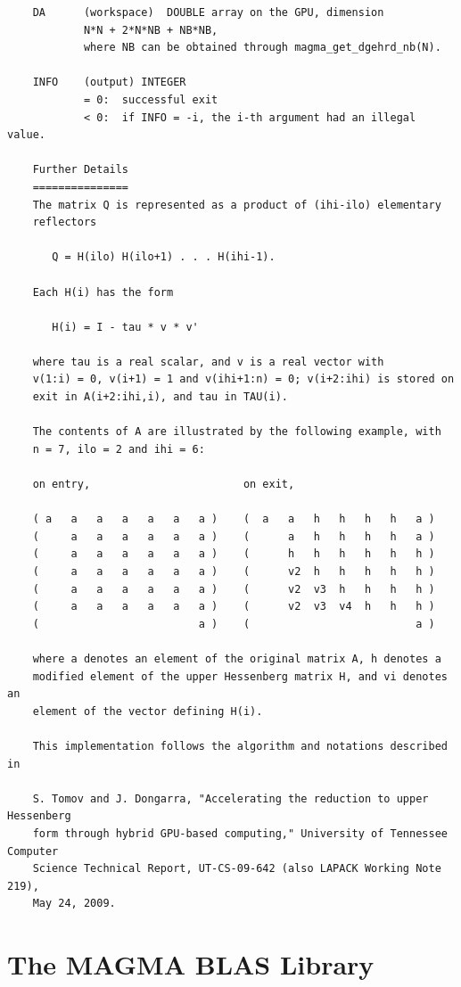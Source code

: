 \documentclass[10pt]{book}
\begin{document}
\begin{verbatim}
    DA      (workspace)  DOUBLE array on the GPU, dimension
            N*N + 2*N*NB + NB*NB,
            where NB can be obtained through magma_get_dgehrd_nb(N).

    INFO    (output) INTEGER
            = 0:  successful exit
            < 0:  if INFO = -i, the i-th argument had an illegal value.

    Further Details
    ===============
    The matrix Q is represented as a product of (ihi-ilo) elementary
    reflectors

       Q = H(ilo) H(ilo+1) . . . H(ihi-1).

    Each H(i) has the form

       H(i) = I - tau * v * v'

    where tau is a real scalar, and v is a real vector with
    v(1:i) = 0, v(i+1) = 1 and v(ihi+1:n) = 0; v(i+2:ihi) is stored on
    exit in A(i+2:ihi,i), and tau in TAU(i).

    The contents of A are illustrated by the following example, with
    n = 7, ilo = 2 and ihi = 6:

    on entry,                        on exit,

    ( a   a   a   a   a   a   a )    (  a   a   h   h   h   h   a )
    (     a   a   a   a   a   a )    (      a   h   h   h   h   a )
    (     a   a   a   a   a   a )    (      h   h   h   h   h   h )
    (     a   a   a   a   a   a )    (      v2  h   h   h   h   h )
    (     a   a   a   a   a   a )    (      v2  v3  h   h   h   h )
    (     a   a   a   a   a   a )    (      v2  v3  v4  h   h   h )
    (                         a )    (                          a )

    where a denotes an element of the original matrix A, h denotes a
    modified element of the upper Hessenberg matrix H, and vi denotes an
    element of the vector defining H(i).

    This implementation follows the algorithm and notations described in

    S. Tomov and J. Dongarra, "Accelerating the reduction to upper Hessenberg
    form through hybrid GPU-based computing," University of Tennessee Computer
    Science Technical Report, UT-CS-09-642 (also LAPACK Working Note 219),
    May 24, 2009.
\end{verbatim}



\chapter{The MAGMA BLAS Library}
\end{document}

